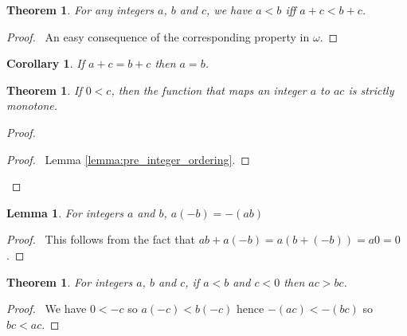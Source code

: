 \documentclass{report}
\let\qed\relax
\newtheorem{lemma}[axiom]{Lemma}
\newtheorem{theorem}[axiom]{Theorem}
\newtheorem{corollary}{Corollary}[axiom]
\theoremstyle{definition}
\begin{document}
    \begin{theorem}
        For any integers $a$, $b$ and $c$, we have $a < b$ iff $a + c < b + c$.
    \end{theorem}

    \begin{proof}
        \pf\ An easy consequence of the corresponding property in $\omega$.
    \end{proof}

    \begin{corollary}
        If $a + c = b + c$ then $a = b$.
    \end{corollary}

    \begin{theorem}
        If $0 < c$, then the function that maps an integer $a$ to $ac$ is strictly monotone.
    \end{theorem}

    \begin{proof}
        \pf
        \begin{proof}
            \pf\ Lemma \ref{lemma:pre_integer_ordering}.
        \end{proof}
        \qed
    \end{proof}

    \begin{lemma}
        For integers $a$ and $b$,
        $a(-b) = -(ab)$
    \end{lemma}

    \begin{proof}
        \pf\ This follows from the fact that $ab + a(-b) = a(b + (-b)) = a0 = 0$. \qed
    \end{proof}

    \begin{theorem}
        For integers $a$, $b$ and $c$, if $a < b$ and $c < 0$ then $ac > bc$.
    \end{theorem}

    \begin{proof}
        \pf\ We have $0 < -c$ so $a(-c) < b(-c)$ hence $-(ac) < -(bc)$ so $bc < ac$. \qed
    \end{proof}
\end{document}

